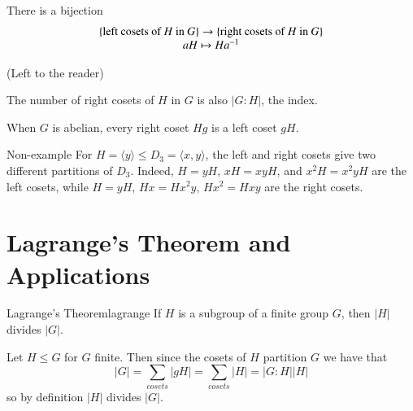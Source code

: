 \documentclass[12pt, a4paper, twoside, openright, titlepage]{book}
\begin{document}
\begin{prop}{}{}
        There is a bijection \begin{equation}
                \begin{array}{c} \{\text{left cosets of $H$ in $G$}\}\rightarrow \{\text{right cosets of $H$ in $G$}\} \\ aH \mapsto Ha^{-1} \end{array}
        \end{equation}
\end{prop}
\begin{proof*}{}{}
        (Left to the reader)
\end{proof*}

\begin{cor}{}{}
        The number of right cosets of $H$ in $G$ is also $|G:H|$, the index.
\end{cor}


\begin{rmk}{}{}
        When $G$ is abelian, every right coset $Hg$ is a left coset $gH$.
\end{rmk}

\begin{eg}{Non-example}{}
        For $H = \langle y \rangle \leq D_3 = \langle x,y\rangle$, the left and right cosets give two different partitions of $D_3$. Indeed, $H = yH$, $xH = xyH$, and $x^2H = x^2yH$ are the left cosets, while $H = yH$, $Hx = Hx^2y$, $Hx^2 = Hxy$ are the right cosets.
\end{eg}


\section{\textsection Lagrange's Theorem and Applications}

\begin{namthm}{Lagrange's Theorem}{lagrange}
        If $H$ is a subgroup of a finite group $G$, then $|H|$ divides $|G|$.
\end{namthm}
\begin{proof*}{}{}
        Let $H\leq G$ for $G$ finite. Then since the cosets of $H$ partition $G$ we have that \begin{equation}
                |G| = \sum\limits_{cosets}|gH| = \sum\limits_{cosets}|H| = |G:H||H|
        \end{equation}
        so by definition $|H|$ divides $|G|$.
\end{proof*}
\end{document}
